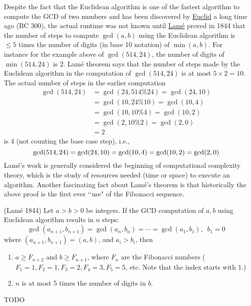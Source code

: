Despite the fact that the Euclidean algorithm is one of the fastest
algorithm to compute the GCD of two numbers and has been discovered
by
\href{https://en.wikipedia.org/wiki/Euclid}{Euclid} a long time ago (BC 300),
the actual runtime was not known until
\href{https://en.wikipedia.org/wiki/Gabriel_Lam%C3%A9}{Lam\'e}
proved in 1844 that the number of steps to compute
$\gcd(a, b)$ using the Euclidean algorithm
is $\leq 5$ times the number of digits (in base 10 notation)
of $\min(a, b)$.
For instance for the example above
of $\gcd(514, 24)$, the number of digits of $\min(514,24)$ is $2$.
Lam\'e theorem says that the number of steps made by the
Euclidean algorithm in the computation of $\gcd(514, 24)$ is
at most $5 \times 2 = 10$.
The actual number of steps in the earlier computation
\begin{align*}
  \gcd(514, 24)
  &= \gcd(24, 514 \% 24) = \gcd(24, 10) \\
  &= \gcd(10, 24 \% 10) = \gcd(10, 4) \\
  &= \gcd(10, 10 \% 4) = \gcd(10, 2) \\
  &= \gcd(2, 10 \% 2) = \gcd(2, 0) \\
  &= 2
\end{align*}
is 4 (not counting the base case step), i.e.,
\[
  \gcd(514, 24)
 = \gcd(24, 10) \\
 = \gcd(10, 4) \\
 = \gcd(10, 2) \\
 = \gcd(2, 0) \\
\]
Lam\'e's work is generally considered the beginning of
computational complexity theory, which is the study of
resources needed (time or space) to execute an algorithm.
Another fascinating fact about Lam\'e's theorem is that historically
the above proof is the first ever \lq\lq use" of the Fibonacci sequence.

\begin{thm} \textnormal{(Lam\'e 1844)}
  Let $a > b > 0$ be integers.
  If the GCD computation of $a,b$ 
  using Euclidean algorithm results in $n$ steps:
  \[
  \gcd(a_{n+1}, b_{n+1})
  = \gcd(a_{n}, b_{n})
  = \cdots
  = \gcd(a_1, b_1), \,\,\, b_1 = 0
  \]
  where $(a_{n+1}, b_{n+1}) = (a, b)$, and $a_i > b_i$, then
  \begin{enumerate}[nosep,label=\textnormal{(\alph*)}]
  \item  $a \geq F_{n+2}$ and
    $b \geq F_{n+1}$, where $F_n$ are the Fibonacci numbers
    ($F_1 = 1, F_2 = 1, F_3 = 2, F_4 = 3, F_5 = 5$, etc.
    Note that the index starts with $1$.)
  \item $n$ is at most 5 times the number of digits in $b$.
  \end{enumerate}
\end{thm}
\proof
TODO
  
